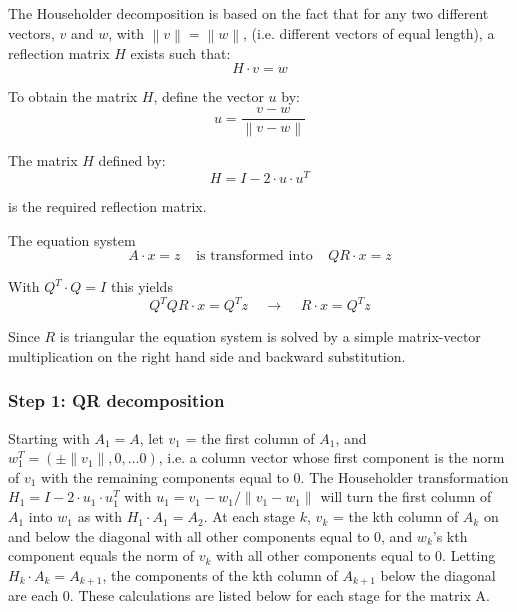 The Householder decomposition is based on the fact that for any two
different vectors, $v$ and $w$, with $\left\lVert v\right\rVert =
\left\lVert w\right\rVert$, (i.e. different vectors of equal length),
a reflection matrix $H$ exists such that:
\begin{equation}
H \cdot v = w
\end{equation}

To obtain the matrix $H$, define the vector $u$ by:
\begin{equation}
u = \dfrac{v - w}{\left\lVert v - w\right\rVert}
\end{equation}

The matrix $H$ defined by: 
\begin{equation}
\label{eq:ReflectionMatrix}
H = I - 2 \cdot u \cdot u^T
\end{equation}

is the required reflection matrix. 

\addvspace{12pt}

The equation system
\begin{equation}
A\cdot x = z
\;\;\;\; \textrm{is transformed into} \;\;\;\;
Q R\cdot x = z
\end{equation}

With $Q^T\cdot Q = I$ this yields
\begin{equation}
Q^T Q R\cdot x = Q^T z
\;\;\;\; \rightarrow \;\;\;\;
R\cdot x = Q^T z
\end{equation}

Since $R$ is triangular the equation system is solved by a simple
matrix-vector multiplication on the right hand side and backward
substitution.

\subsubsection{Step 1: QR decomposition}

Starting with $A_1 = A$, let $v_1$ = the first column of $A_1$, and
$w_1^T = \left(\pm\lVert v_1\rVert , 0 , \ldots 0\right)$, i.e. a column
vector whose first component is the norm of $v_1$ with the remaining
components equal to 0.  The Householder transformation $H_1 = I - 2
\cdot u_1 \cdot u_1^T$ with $u_1 = v_1 - w_1 / \lVert v_1 - w_1
\rVert$ will turn the first column of $A_1$ into $w_1$ as with $H_1
\cdot A_1 = A_2$.  At each stage $k$, $v_k$ = the kth column of $A_k$
on and below the diagonal with all other components equal to 0, and
$w_k$'s kth component equals the norm of $v_k$ with all other
components equal to 0.  Letting $H_k \cdot A_k = A_{k+1}$, the
components of the kth column of $A_{k+1}$ below the diagonal are each
0.  These calculations are listed below for each stage for the matrix
A.


